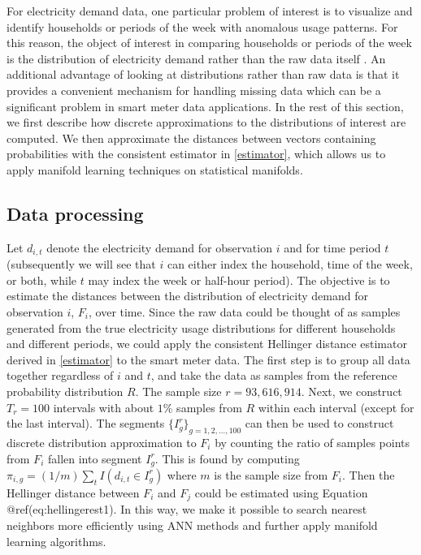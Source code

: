 \documentclass{article}
\begin{document}
For electricity demand data, one particular problem of interest is to
visualize and identify households or periods of the week with anomalous
usage patterns. For this reason, the object of interest in comparing
households or periods of the week is the distribution of electricity
demand rather than the raw data itself \citep{Hyndman2018-ia}. An
additional advantage of looking at distributions rather than raw data is
that it provides a convenient mechanism for handling missing data which
can be a significant problem in smart meter data applications. In the
rest of this section, we first describe how discrete approximations to
the distributions of interest are computed. We then approximate the
distances between vectors containing probabilities with the consistent
estimator in \autoref{estimator}, which allows us to apply manifold
learning techniques on statistical manifolds.

\hypertarget{dataprocessing}{%
\subsection{Data processing}\label{dataprocessing}}

Let \(d_{i,t}\) denote the electricity demand for observation \(i\) and
for time period \(t\) (subsequently we will see that \(i\) can either
index the household, time of the week, or both, while \(t\) may index
the week or half-hour period). The objective is to estimate the
distances between the distribution of electricity demand for observation
\(i\), \(F_i\), over time. Since the raw data could be thought of as
samples generated from the true electricity usage distributions for
different households and different periods, we could apply the
consistent Hellinger distance estimator derived in \autoref{estimator}
to the smart meter data. The first step is to group all data together
regardless of \(i\) and \(t\), and take the data as samples from the
reference probability distribution \(R\). The sample size
\(r=93,616,914\). Next, we construct \(T_r=100\) intervals with about
\(1\%\) samples from \(R\) within each interval (except for the last
interval). The segments \(\{I_g^r\}_{g=1,2,\dots,100}\) can then be used
to construct discrete distribution approximation to \(F_i\) by counting
the ratio of samples points from \(F_i\) fallen into segment \(I_g^r\).
This is found by computing
\(\pi_{i,g}=(1/m)\sum_t I(d_{i,t} \in I_g^r)\) where \(m\) is the sample
size from \(F_i\). Then the Hellinger distance between \(F_i\) and
\(F_j\) could be estimated using Equation @ref(eq:hellingerest1). In
this way, we make it possible to search nearest neighbors more
efficiently using ANN methods and further apply manifold learning
algorithms.
\end{document}
